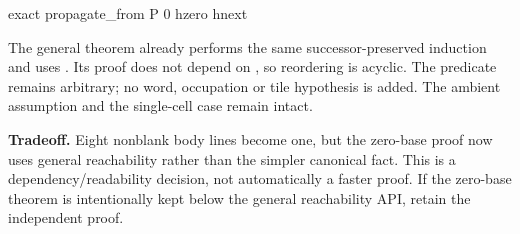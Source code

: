 \begin{Lean}
  exact propagate_from P 0 hzero hnext
\end{Lean}

The general theorem already performs the same successor-preserved induction
and uses . Its proof does not depend on ,
so reordering is acyclic. The predicate remains arbitrary; no word,
occupation or tile hypothesis is added. The ambient
\code{[NeZero (N * 2011)]} assumption and the single-cell case remain intact.

\textbf{Tradeoff.} Eight nonblank body lines become one, but the zero-base
proof now uses general reachability rather than the simpler canonical
 fact. This is a dependency/readability decision,
not automatically a faster proof. If the zero-base theorem is intentionally
kept below the general reachability API, retain the independent proof.
